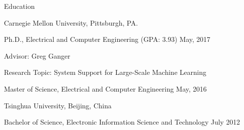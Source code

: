 \documentclass{resume} %
\begin{document}





\vspace{-.2in}

\begin{rSection}{Education}

\begin{rSubsection}{\hspace{-1em} Carnegie Mellon University, Pittsburgh, PA.}{}{}{}
\vspace{-0.3em}
\item[] \hspace{-2em} Ph.D., Electrical and Computer Engineering (GPA: 3.93) \hfill May, 2017
\item Advisor: Greg Ganger
\item Research Topic: System Support for Large-Scale Machine Learning
\item[] \hspace{-2em} Master of Science, Electrical and Computer Engineering \hfill May, 2016
\end{rSubsection}
\vspace{-.1in}

\begin{rSubsection}{\hspace{-1em} Tsinghua University, Beijing, China}{}{}{}
\vspace{-0.3em}
\item[] \hspace{-2em} Bachelor of Science, Electronic Information Science and Technology \hfill July 2012
\end{rSubsection}
\vspace{-.1in}

\end{rSection}
\vspace{-.05in}
\end{document}
